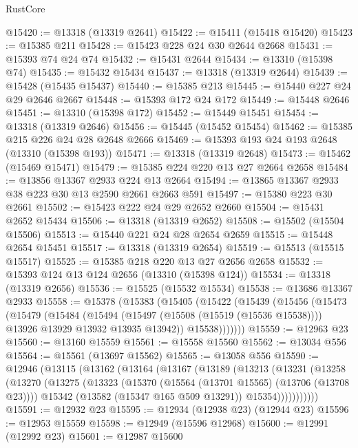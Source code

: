 \begin{lexlean}{RustCore}
\begin{coremodule}
@15420 := @13318 (@13319 @2641)
@15422 := @15411 (@15418 @15420)
@15423 := @15385 @211
@15428 := @15423 @228 @24 @30 @2644 @2668
@15431 := @15393 @74 @24 @74
@15432 := @15431 @2644
@15434 := @13310 (@15398 @74)
@15435 := @15432 @15434
@15437 := @13318 (@13319 @2644)
@15439 := @15428 (@15435 @15437)
@15440 := @15385 @213
@15445 := @15440 @227 @24 @29 @2646 @2667
@15448 := @15393 @172 @24 @172
@15449 := @15448 @2646
@15451 := @13310 (@15398 @172)
@15452 := @15449 @15451
@15454 := @13318 (@13319 @2646)
@15456 := @15445 (@15452 @15454)
@15462 := @15385 @215 @226 @24 @28 @2648 @2666
@15469 := @15393 @193 @24 @193 @2648 (@13310 (@15398 @193))
@15471 := @13318 (@13319 @2648)
@15473 := @15462 (@15469 @15471)
@15479 := @15385 @224 @220 @13 @27 @2664 @2658
@15484 := @13856 @13367 @2933 @224 @13 @2664
@15494 := @13865 @13367 @2933 @38 @223 @30 @13 @2590 @2661 @2663 @591
@15497 := @15380 @223 @30 @2661
@15502 := @15423 @222 @24 @29 @2652 @2660
@15504 := @15431 @2652 @15434
@15506 := @13318 (@13319 @2652)
@15508 := @15502 (@15504 @15506)
@15513 := @15440 @221 @24 @28 @2654 @2659
@15515 := @15448 @2654 @15451
@15517 := @13318 (@13319 @2654)
@15519 := @15513 (@15515 @15517)
@15525 := @15385 @218 @220 @13 @27 @2656 @2658
@15532 := @15393 @124 @13 @124 @2656 (@13310 (@15398 @124))
@15534 := @13318 (@13319 @2656)
@15536 := @15525 (@15532 @15534)
@15538 := @13686 @13367 @2933
@15558 := @15378
    (@15383
      (@15405
        (@15422
          (@15439
            (@15456
              (@15473
                (@15479
                  (@15484
                    (@15494
                      (@15497 (@15508 (@15519 (@15536 @15538))))
                      @13926
                      @13929
                      @13932
                      @13935
                      @13942))
                  @15538)))))))
@15559 := @12963 @23
@15560 := @13160 @15559
@15561 := @15558 @15560
@15562 := @13034 @556
@15564 := @15561 (@13697 @15562)
@15565 := @13058 @556
@15590 := @12946
    (@13115
      (@13162
        (@13164
          (@13167
            (@13189
              (@13213
                (@13231
                  (@13258
                    (@13270
                      (@13275
                        (@13323
                          (@15370 (@15564 (@13701 @15565) (@13706 (@13708 @23))))
                          @15342
                          (@13582 (@15347 @165 @509 @13291))
                          @15354)))))))))))
@15591 := @12932 @23
@15595 := @12934 (@12938 @23) (@12944 @23)
@15596 := @12953 @15559
@15598 := @12949 (@15596 @12968)
@15600 := @12991 (@12992 @23)
@15601 := @12987 @15600

\end{coremodule}
\end{lexlean}
